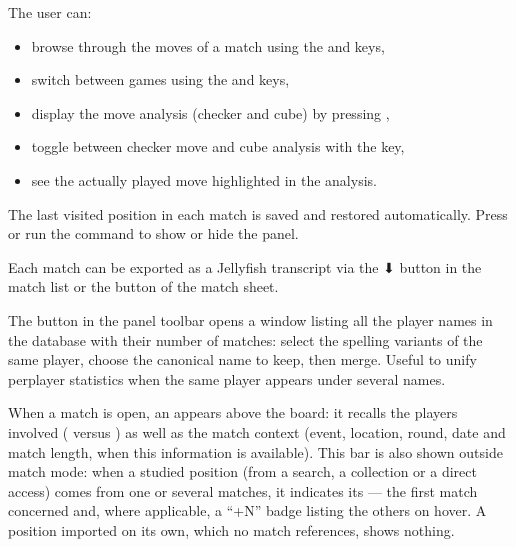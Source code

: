 \documentclass[letterpaper,10pt,english]{sphinxmanual}
\begin{document}
\sphinxAtStartPar
The user can:
\begin{itemize}
\item {} 
\sphinxAtStartPar
browse through the moves of a match using the  and  keys,

\item {} 
\sphinxAtStartPar
switch between games using the  and  keys,

\item {} 
\sphinxAtStartPar
display the move analysis (checker and cube) by pressing ,

\item {} 
\sphinxAtStartPar
toggle between checker move and cube analysis with the  key,

\item {} 
\sphinxAtStartPar
see the actually played move highlighted in the analysis.

\end{itemize}

\sphinxAtStartPar
The last visited position in each match is saved and restored automatically. Press  or run the  command to show or hide the panel.

\sphinxAtStartPar
Each match can be exported as a Jellyfish  transcript via the ⬇ button in the match list or the  button of the match sheet.

\sphinxAtStartPar
The  button in the panel toolbar opens a window listing all the player names in the database with their number of matches: select the spelling variants of the same player, choose the canonical name to keep, then merge. Useful to unify per\sphinxhyphen{}player statistics when the same player appears under several names.

\sphinxAtStartPar
When a match is open, an  appears above the board: it recalls the players involved ( versus ) as well as the match context (event, location, round, date and match length, when this information is available). This bar is also shown outside match mode: when a studied position (from a search, a collection or a direct access) comes from one or several matches, it indicates its  — the first match concerned and, where applicable, a “+N” badge listing the others on hover. A position imported on its own, which no match references, shows nothing.
\end{document}
